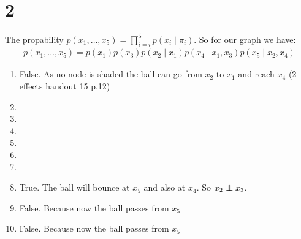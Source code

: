 \section*{2}
The propability $p(x_1,\dotsc,x_5) = \prod_{i=i}^5 p(x_i\mid \pi_i)$.
So for our graph we have:
\begin{align*}
p(x_1,\dotsc,x_5) = p(x_1)p(x_3)p(x_2\mid x_1)p(x_4\mid x_{1},x_3)p(x_5\mid x_{2},x_4)
\end{align*}
\begin{enumerate}
\item False. As no node is shaded the ball can go from $x_2$ to $x_1$ and reach $x_4$ (2 effects handout 15 p.12)
\item 
\item
\item
\item
\item
\item
\item True. The ball will bounce at $x_5$ and also at $x_4$. So $x_2 \independent x_3$. 
\item False. Because now the ball passes from $x_5$
\item False. Because now the ball passes from $x_5$
\end{enumerate}
